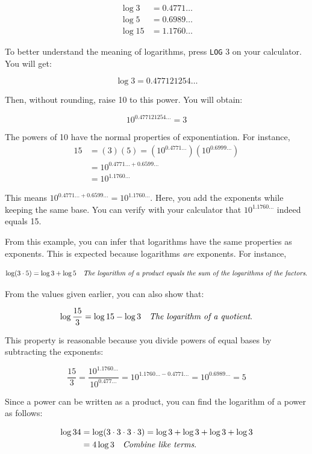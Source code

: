\[
\begin{aligned}
\log 3 & = 0.4771 \ldots \\
\log 5 & = 0.6989 \ldots \\
\log 15 & = 1.1760 \ldots
\end{aligned}
\]

To better understand the meaning of logarithms, press \texttt{LOG} 3 on your calculator. You will get:

\[
\log 3 = 0.477121254 \ldots
\]

Then, without rounding, raise 10 to this power. You will obtain:

\[
10^{0.477121254 \ldots} = 3
\]

The powers of 10 have the normal properties of exponentiation. For instance,
\[
\begin{aligned}
15 & = (3)(5) = \left(10^{0.4771 \ldots}\right)\left(10^{0.6999 \ldots}\right) \\
& = 10^{0.4771 \ldots + 0.6599 \ldots} \\
& = 10^{1.1760 \ldots}
\end{aligned}
\]

This means \(10^{0.4771 \ldots + 0.6599 \ldots} = 10^{1.1760 \ldots}\). Here, you add the exponents while keeping the same base. You can verify with your calculator that \(10^{1.1760 \ldots}\) indeed equals 15.

From this example, you can infer that logarithms have the same properties as exponents. This is expected because logarithms \textit{are} exponents. For instance,

\[
\log(3 \cdot 5) = \log 3 + \log 5 \quad \text{\textit{The logarithm of a product equals the sum of the logarithms of the factors}.}
\]

From the values given earlier, you can also show that:

\[
\log \frac{15}{3} = \log 15 - \log 3 \quad \text{\textit{The logarithm of a quotient}.}
\]

This property is reasonable because you divide powers of equal bases by subtracting the exponents:

\[
\frac{15}{3} = \frac{10^{1.1760 \ldots}}{10^{0.477 \ldots}} = 10^{1.1760 \ldots - 0.4771 \ldots} = 10^{0.6989 \ldots} = 5
\]

Since a power can be written as a product, you can find the logarithm of a power as follows:

\[
\begin{aligned}
\log 34 & = \log (3 \cdot 3 \cdot 3 \cdot 3) = \log 3 + \log 3 + \log 3 + \log 3 \\
& = 4 \log 3 \quad \text{\textit{Combine like terms}.}
\end{aligned}
\]

